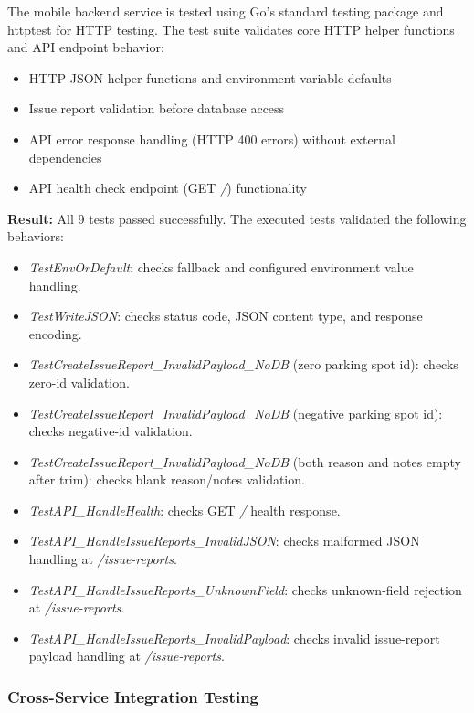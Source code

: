 The mobile backend service is tested using Go's standard testing package and httptest for HTTP testing. The test suite validates core HTTP helper functions and API endpoint behavior:

\begin{itemize}
    \item HTTP JSON helper functions and environment variable defaults
    \item Issue report validation before database access
    \item API error response handling (HTTP 400 errors) without external dependencies
    \item API health check endpoint (GET \textit{/}) functionality
\end{itemize}

\noindent\textbf{Result:} All 9 tests passed successfully. The executed tests validated the following behaviors:
\begin{itemize}
    \item \textit{TestEnvOrDefault}: checks fallback and configured environment value handling.
    \item \textit{TestWriteJSON}: checks status code, JSON content type, and response encoding.
    \item \textit{TestCreateIssueReport\_InvalidPayload\_NoDB} (zero parking spot id): checks zero-id validation.
    \item \textit{TestCreateIssueReport\_InvalidPayload\_NoDB} (negative parking spot id): checks negative-id validation.
    \item \textit{TestCreateIssueReport\_InvalidPayload\_NoDB} (both reason and notes empty after trim): checks blank reason/notes validation.
    \item \textit{TestAPI\_HandleHealth}: checks GET \textit{/} health response.
    \item \textit{TestAPI\_HandleIssueReports\_InvalidJSON}: checks malformed JSON handling at \textit{/issue-reports}.
    \item \textit{TestAPI\_HandleIssueReports\_UnknownField}: checks unknown-field rejection at \textit{/issue-reports}.
    \item \textit{TestAPI\_HandleIssueReports\_InvalidPayload}: checks invalid issue-report payload handling at \textit{/issue-reports}.
\end{itemize}

\subsubsection{Cross-Service Integration Testing}

